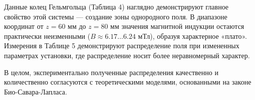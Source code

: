 \documentclass[a4paper,14pt]{extarticle}
\begin{document}
Данные колец Гельмгольца (Таблица 4) наглядно демонстрируют главное свойство этой системы — создание зоны однородного поля. В диапазоне координат от $z = 60$ мм до $z = 80$ мм значения магнитной индукции остаются практически неизменными ($B \approx 6.17 \dots 6.24$ мТл), образуя характерное «плато». Измерения в Таблице 5 демонстрируют распределение поля при измененных параметрах установки, где распределение носит более неравномерный характер.

В целом, экспериментально полученные распределения качественно и количественно согласуются с теоретическими моделями, основанными на законе Био-Савара-Лапласа.
\end{document}
